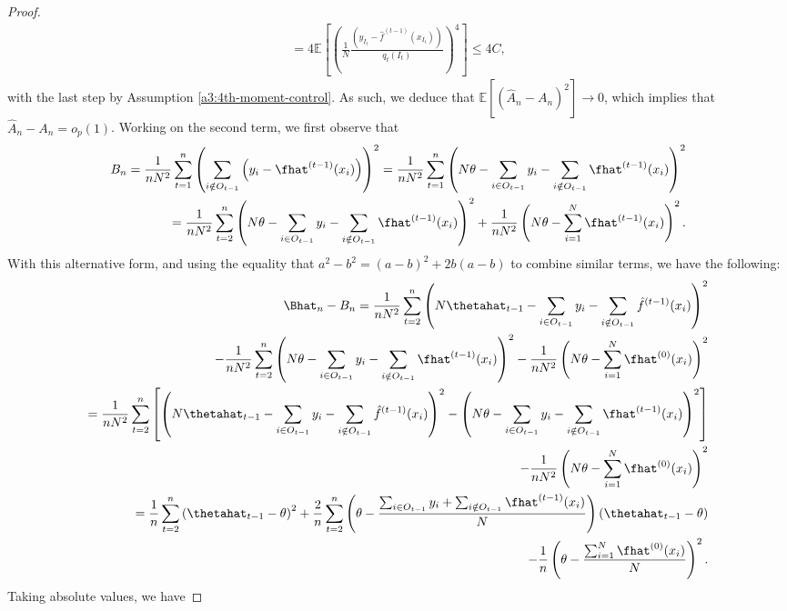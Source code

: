 \documentclass[11pt]{article}
\begin{document}
\begin{proof}
\begin{align*}
        = 4 \mathbb{E}\left[ \left( \frac{1}{N} \frac{\left( y_{I_t} - \hat{f}^{(t-1)}\left( x_{I_t} \right) \right)}{q_t(I_t)} \right)^4\right] \leq 4C,
    \end{align*}
    with the last step by Assumption \ref{a3:4th-moment-control}. As such, we deduce that $\mathbb{E}\left[ \left( \hat{A}_n - A_n \right)^2 \right] \to 0$, which implies that $\hat{A}_n - A_n = o_p(1)$. Working on the second term, we first observe that
    \begin{align*}
        B_n = \frac{1}{n N^2} \sum_{t=1}^n \left( \sum_{i \notin O_{t-1}} \left( y_i - \fhat^{(t-1)}(x_i) \right) \right)^2 = \frac{1}{n N^2} \sum_{t=1}^n \left( N\theta - \sum_{i \in O_{t-1}} y_i - \sum_{i \notin O_{t-1}} \fhat^{(t-1)}(x_i)  \right)^2\\
        = \frac{1}{n N^2} \sum_{t=2}^n \left( N\theta - \sum_{i \in O_{t-1}} y_i - \sum_{i \notin O_{t-1}} \fhat^{(t-1)}(x_i)  \right)^2 + \frac{1}{nN^2} \left( N\theta - \sum_{i=1}^N \fhat^{(t-1)}(x_i) \right)^2.
    \end{align*}
    With this alternative form, and using the equality that $a^2 - b^2 = (a - b)^2 + 2b(a-b)$ to combine similar terms, we have the following:
    \begin{align*}
        \Bhat_n - B_n = \frac{1}{nN^2} \sum_{t=2}^n \left( N\thetahat_{t-1} - \sum_{i \in O_{t-1}} y_i - \sum_{i \notin O_{t-1}} \hat{f}^{(t-1)}(x_i) \right)^2\\ - \frac{1}{n N^2} \sum_{t=2}^n \left( N\theta - \sum_{i \in O_{t-1}} y_i - \sum_{i \notin O_{t-1}} \fhat^{(t-1)}(x_i)  \right)^2 - \frac{1}{nN^2} \left( N\theta - \sum_{i=1}^N \fhat^{(0)}(x_i) \right)^2\\
        = \frac{1}{nN^2} \sum_{t=2}^n \left[ \left( N\thetahat_{t-1} - \sum_{i \in O_{t-1}} y_i - \sum_{i \notin O_{t-1}} \hat{f}^{(t-1)}(x_i) \right)^2 - \left( N\theta - \sum_{i \in O_{t-1}} y_i - \sum_{i \notin O_{t-1}} \fhat^{(t-1)}(x_i)  \right)^2 \right]\\ - \frac{1}{nN^2} \left( N\theta - \sum_{i=1}^N \fhat^{(0)}(x_i) \right)^2\\
        = \frac{1}{n} \sum_{t=2}^n \left( \thetahat_{t-1} - \theta \right)^2 + \frac{2}{n} \sum_{t=2}^n \left( \theta - \frac{\sum_{i \in O_{t-1}} y_i + \sum_{i \notin O_{t-1}} \fhat^{(t-1)}(x_i)}{N} \right) \left( \thetahat_{t-1} - \theta \right)\\ - \frac{1}{n} \left( \theta - \frac{\sum_{i=1}^N \fhat^{(0)}(x_i)}{N} \right)^2.
    \end{align*}
    Taking absolute values, we have

\end{proof}
\end{document}
